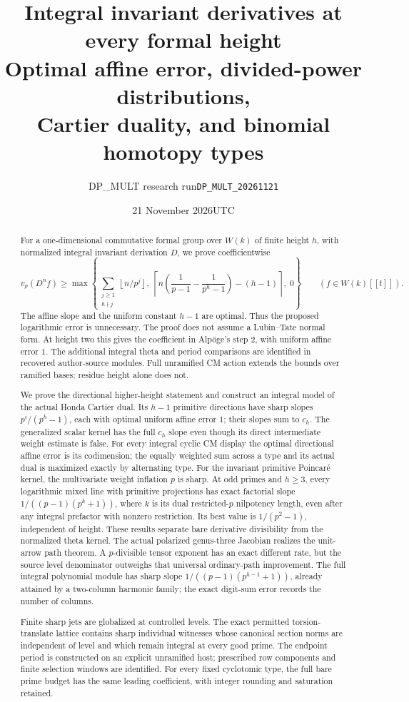 \documentclass[11pt,a4paper]{article}
\title{Integral invariant derivatives at every formal height\\
\large Optimal affine error, divided-power distributions,\\Cartier duality, and binomial homotopy types}
\author{DP\_MULT research run\quad\texttt{DP\_MULT\_20261121}}
\date{21 November 2026\quad UTC}
\theoremstyle{definition}\newtheorem{remark}[theorem]{Remark}
\newcommand{\vp}{v_p}\newcommand{\dR}{\mathrm{dR}}\newcommand{\crys}{\mathrm{crys}}
\newcommand{\ceil}[1]{\left\lceil #1\right\rceil}\newcommand{\floor}[1]{\left\lfloor #1\right\rfloor}
\begin{document}
\maketitle
\begin{abstract}
For a one-dimensional commutative formal group over $W(k)$ of finite height $h$, with normalized integral invariant derivation $D$, we prove coefficientwise
\[
 \vp(D^n f)\ge
 \max\left\{\sum_{\substack{j\ge1\\h\nmid j}}\floor{n/p^j},\;
 \ceil{n\left(\frac1{p-1}-\frac1{p^h-1}\right)-(h-1)},\;0\right\}
 \qquad(f\in W(k)[[t]]).
\]
The affine slope and the uniform constant $h-1$ are optimal. Thus the proposed logarithmic error is unnecessary. The proof does not assume a Lubin--Tate normal form. At height two this gives the coefficient in Alp\"oge's step 2, with uniform affine error $1$. The additional integral theta and period comparisons are identified in recovered author-source modules. Full unramified CM action extends the bounds over ramified bases; residue height alone does not.

We prove the directional higher-height statement and construct an integral model of the actual Honda Cartier dual. Its $h-1$ primitive directions have sharp slopes $p^i/(p^h-1)$, each with optimal uniform affine error $1$; their slopes sum to $c_h$. The generalized scalar kernel has the full $c_h$ slope even though its direct intermediate weight estimate is false. For every integral cyclic CM display the optimal directional affine error is its codimension; the equally weighted sum across a type and its actual dual is maximized exactly by alternating type. For the invariant primitive Poincar\'e kernel, the multivariate weight inflation $p$ is sharp. At odd primes and $h\ge3$, every logarithmic mixed line with primitive projections has exact factorial slope $1/((p-1)(p^k+1))$, where $k$ is its dual restricted-$p$ nilpotency length, even after any integral prefactor with nonzero restriction. Its best value is $1/(p^2-1)$, independent of height. These results separate bare derivative divisibility from the normalized theta kernel. The actual polarized genus-three Jacobian realizes the unit-arrow path theorem. A $p$-divisible tensor exponent has an exact different rate, but the source level denominator outweighs that universal ordinary-path improvement. The full integral polynomial module has sharp slope $1/((p-1)(p^{h-1}+1))$, already attained by a two-column harmonic family; the exact digit-sum error records the number of columns.

Finite sharp jets are globalized at controlled levels. The exact permitted torsion-translate lattice contains sharp individual witnesses whose canonical section norms are independent of level and which remain integral at every good prime. The endpoint period is constructed on an explicit unramified host; prescribed row components and finite selection windows are identified. For every fixed cyclotomic type, the full bare prime budget has the same leading coefficient, with integer rounding and saturation retained.


\end{abstract}
\end{document}
